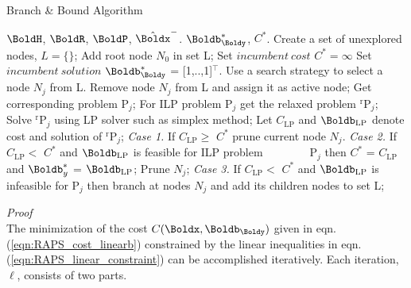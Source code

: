 \begin{algorithm}[t]  
	\setlength{\belowdisplayskip}{-5pt} 
	\setlength{\belowdisplayshortskip}{-5pt}
	\setlength{\abovedisplayskip}{0pt} 
	\setlength{\abovedisplayshortskip}{-1pt}
	\caption{Branch \& Bound Algorithm} 
	\label{alg:RAPS_BnB}                   
	\begin{algorithmic}[1] 
		\Require $\BoldH$, $\BoldR$, $\BoldP$, $\hat{\Boldx}^-$.
		\Ensure $\Boldb_{\Boldy}^*$, $C^*$.
		\State Create a set of unexplored nodes, $L=\{\}$;
		\State Add root node $N_0$ in set L;
		\State Set $incumbent~cost$ $C^* = \infty$ 
		\State Set $incumbent~solution$ $\Boldb_{\Boldy}^*$ = [1,..,1]$^\top$.
		\State Use a search strategy to select a node $N_j$ from L.
		\State Remove node $N_j$ from L and assign it as active node; 
		\State Get corresponding problem P$_j$;
		\State For ILP problem P$_j$ get the relaxed problem $^\text{r}$P$_{j}$;
		\State Solve $^\text{r}$P$_{j}$ using LP solver such as simplex method;
		\State Let $C_{\text{LP}}$ and $\Boldb_{\text{LP}}$ denote cost and solution of $^\text{r}$P$_{j}$;
		\Statex \quad\quad \textit{Case 1.} If $C_{\text{LP}} \ge $ $C^*$ prune current node $N_j$.
		\Statex \quad\quad \textit{Case 2.} If $C_{\text{LP}} < $ $C^*$ and $\Boldb_{\text{LP}}$ is feasible for ILP problem
		\Statex $~~~~~~~~~~~~~~~~$ P$_j$ then $C^*$ = $C_{\text{LP}}$ and $\Boldb_y^*$ = $\Boldb_{\text{LP}}$; Prune $N_j$;
		\Statex \quad\quad \textit{Case 3.} If $C_{\text{LP}} < $ $C^*$ and $\Boldb_{\text{LP}}$ is infeasible for P$_j$ then 
		\Statex \qquad \qquad \qquad branch at nodes $N_j$ and add its children nodes  
		\Statex \qquad \qquad \qquad to set L;

		\EndWhile 		
	\end{algorithmic}
\end{algorithm}

\newpage
\noindent
{\textit{Proof}}\\
The minimization of the cost $C(\Boldx,\Boldb_{\Boldy})$ given in eqn. (\ref{eqn:RAPS_cost_linearb}) constrained by the linear inequalities in eqn. (\ref{eqn:RAPS_linear_constraint}) can be accomplished iteratively. 
Each iteration, $\ell$, consists of two parts.

